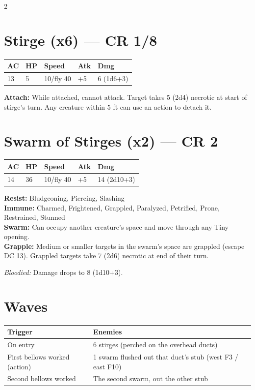 \documentclass[10pt,letterpaper]{article}
\begin{document}
\begin{multicols}{2}

\section*{Stirge (x6) --- CR 1/8}

\begin{tabularx}{\columnwidth}{@{}XXXXX@{}}
\toprule
AC & HP & Speed & Atk & Dmg \\
\midrule
13 & 5 & 10/fly 40 & +5 & 6 (1d6+3) \\
\bottomrule
\end{tabularx}

\vspace{4pt}

\textbf{Attach:} While attached, cannot attack. Target takes 5 (2d4) necrotic at start of stirge's turn. Any creature within 5 ft can use an action to detach it.

\section*{Swarm of Stirges (x2) --- CR 2}

\begin{tabularx}{\columnwidth}{@{}XXXXX@{}}
\toprule
AC & HP & Speed & Atk & Dmg \\
\midrule
14 & 36 & 10/fly 40 & +5 & 14 (2d10+3) \\
\bottomrule
\end{tabularx}

\vspace{4pt}

\textbf{Resist:} Bludgeoning, Piercing, Slashing\\
\textbf{Immune:} Charmed, Frightened, Grappled, Paralyzed, Petrified, Prone, Restrained, Stunned\\
\textbf{Swarm:} Can occupy another creature's space and move through any Tiny opening.\\
\textbf{Grapple:} Medium or smaller targets in the swarm's space are grappled (escape DC 13). Grappled targets take 7 (2d6) necrotic at end of their turn.

\textit{Bloodied:} Damage drops to 8 (1d10+3).

\section*{Waves}

\begin{tabularx}{\columnwidth}{@{}lX@{}}
\toprule
\textbf{Trigger} & \textbf{Enemies} \\
\midrule
On entry & 6 stirges (perched on the overhead ducts) \\
First bellows worked (action) & 1 swarm flushed out that duct's stub (west F3 / east F10) \\
Second bellows worked & The second swarm, out the other stub \\
\bottomrule
\end{tabularx}


\end{multicols}
\end{document}
